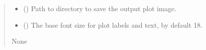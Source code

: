\documentclass[letterpaper,10pt,english]{sphinxmanual}
\begin{document}
\begin{fulllineitems}
\begin{quote}
\begin{description}
\begin{itemize}
\item {} 
\sphinxAtStartPar
{} (\sphinxstyleliteralemphasis{\sphinxupquote{, }}) \textendash{} Path to directory to save the output plot image.

\item {} 
\sphinxAtStartPar
{} (\sphinxstyleliteralemphasis{\sphinxupquote{, }}) \textendash{} The base font size for plot labels and text, by default 18.

\end{itemize}

\sphinxAtStartPar
None

\end{description}\end{quote}

\end{fulllineitems}

\end{document}

